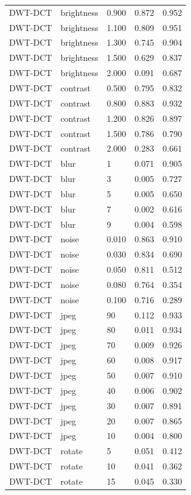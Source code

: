 \begin{table}
\begin{tabular}{lllrr}
DWT-DCT & brightness & 0.900 & 0.872 & 0.952 \\
DWT-DCT & brightness & 1.100 & 0.809 & 0.951 \\
DWT-DCT & brightness & 1.300 & 0.745 & 0.904 \\
DWT-DCT & brightness & 1.500 & 0.629 & 0.837 \\
DWT-DCT & brightness & 2.000 & 0.091 & 0.687 \\
DWT-DCT & contrast & 0.500 & 0.795 & 0.832 \\
DWT-DCT & contrast & 0.800 & 0.883 & 0.932 \\
DWT-DCT & contrast & 1.200 & 0.826 & 0.897 \\
DWT-DCT & contrast & 1.500 & 0.786 & 0.790 \\
DWT-DCT & contrast & 2.000 & 0.283 & 0.661 \\
DWT-DCT & blur & 1 & 0.071 & 0.905 \\
DWT-DCT & blur & 3 & 0.005 & 0.727 \\
DWT-DCT & blur & 5 & 0.005 & 0.650 \\
DWT-DCT & blur & 7 & 0.002 & 0.616 \\
DWT-DCT & blur & 9 & 0.004 & 0.598 \\
DWT-DCT & noise & 0.010 & 0.863 & 0.910 \\
DWT-DCT & noise & 0.030 & 0.834 & 0.690 \\
DWT-DCT & noise & 0.050 & 0.811 & 0.512 \\
DWT-DCT & noise & 0.080 & 0.764 & 0.354 \\
DWT-DCT & noise & 0.100 & 0.716 & 0.289 \\
DWT-DCT & jpeg & 90 & 0.112 & 0.933 \\
DWT-DCT & jpeg & 80 & 0.011 & 0.934 \\
DWT-DCT & jpeg & 70 & 0.009 & 0.926 \\
DWT-DCT & jpeg & 60 & 0.008 & 0.917 \\
DWT-DCT & jpeg & 50 & 0.007 & 0.910 \\
DWT-DCT & jpeg & 40 & 0.006 & 0.902 \\
DWT-DCT & jpeg & 30 & 0.007 & 0.891 \\
DWT-DCT & jpeg & 20 & 0.007 & 0.865 \\
DWT-DCT & jpeg & 10 & 0.004 & 0.800 \\
DWT-DCT & rotate & 5 & 0.051 & 0.412 \\
DWT-DCT & rotate & 10 & 0.041 & 0.362 \\
DWT-DCT & rotate & 15 & 0.045 & 0.330 \\

\end{tabular}
\end{table}
